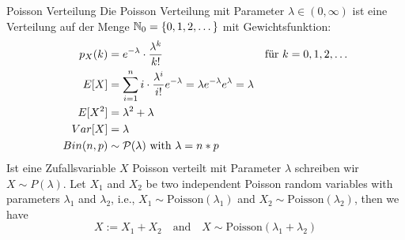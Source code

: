 \begin{definition}{Poisson Verteilung}
  Die Poisson Verteilung mit Parameter $\lambda \in (0, \infty)$ ist eine
Verteilung auf der Menge $\mathbb{N}_0 = \{0, 1, 2, \dots\}$ mit Gewichtsfunktion:
\begin{align*}
  p_X (k) & = e^{-\lambda} \cdot \frac{\lambda^k}{k!}
          &                                                                                            & \text{für } k = 0, 1, 2, \dots \\
  E[X]    & = \sum_{i = 1}^n i \cdot \frac{\lambda^i}{i!} e^{-\lambda} = \lambda e^{-\lambda} e^\lambda = \lambda                                  \\
  E[X^2]  & = \lambda^2 + \lambda                                                                                                       \\
  Var[X]  & = \lambda \\
  Bin(n, p) & \sim \mathcal{P}(\lambda) \text{ with } \lambda = n * p
\end{align*}
Ist eine Zufallsvariable $X$ Poisson verteilt mit Parameter $\lambda$
schreiben wir $X \sim P (\lambda)$.
Let \( X_1 \) and \( X_2 \) be two independent Poisson random variables with parameters \( \lambda_1 \) and \( \lambda_2 \), i.e., \( X_1 \sim \text{Poisson}(\lambda_1) \) and \( X_2 \sim \text{Poisson}(\lambda_2) \), then we have
\[ X := X_1 + X_2 \quad \text{and} \quad X \sim \text{Poisson}(\lambda_1 + \lambda_2) \]
\end{definition}
